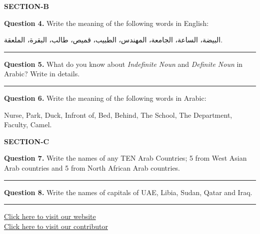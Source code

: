 \documentclass[11pt,a4paper]{article}
\begin{document}
\bigskip


\begin{center}
  {\bfseries\large SECTION-B}
\end{center}




\noindent   \textbf{Question 4.} Write the meaning of the following words in English:

\begin{center}
البيضة، الساعة، الجامعة، المهندس، الطبيب، قميص، طالب، البقرة، الملعقة.
\end{center}

\medskip\rule{\linewidth}{0.2pt}\medskip




\noindent   \textbf{Question 5.} What do you know about   \textit{Indefinite Noun} and   \textit{Definite Noun} in Arabic? Write in details.

\medskip\rule{\linewidth}{0.2pt}\medskip




\noindent   \textbf{Question 6.} Write the meaning of the following words in Arabic:

\begin{center}
Nurse, Park, Duck, Infront of, Bed, Behind, The School, The Department, Faculty, Camel.
\end{center}

\bigskip


\begin{center}
  {\bfseries\large SECTION-C}
\end{center}




\noindent   \textbf{Question 7.} Write the names of any TEN Arab Countries; 5 from West Asian Arab countries and 5 from North African Arab countries.

\medskip\rule{\linewidth}{0.2pt}\medskip




\noindent   \textbf{Question 8.} Write the names of capitals of UAE, Libia, Sudan, Qatar and Iraq.

\vfill
\rule{\linewidth}{0.4pt}

\begin{center}\small
\href{https://bhu-exam.vercel.app/}{Click here to visit our website}\\[4pt]
\href{https://me-aryan.vercel.app/}{Click here to visit our contributor}
\end{center}
\end{document}
